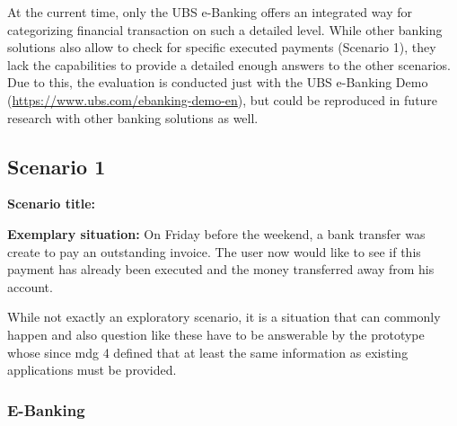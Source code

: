 At the current time, only the UBS e-Banking offers an integrated way for categorizing financial transaction on such a detailed level. While other banking solutions also allow to check for specific executed payments (Scenario 1), they lack the capabilities to provide a detailed enough answers to the other scenarios. Due to this, the evaluation is conducted just with the UBS e-Banking Demo (\url{https://www.ubs.com/ebanking-demo-en}), but could be reproduced in future research with other banking solutions as well.


\subsection{Scenario 1}

\textbf{Scenario title:} \scenone

\textbf{Exemplary situation:} On Friday before the weekend, a bank transfer was create to pay an outstanding invoice. The user now would like to see if this payment has already been executed and the money transferred away from his account. 

While not exactly an exploratory scenario, it is a situation that can commonly happen and also question like these have to be answerable by the prototype whose since \gls{mdg} 4 defined that at least the same information as existing applications must be provided.


\subsubsection{E-Banking}

